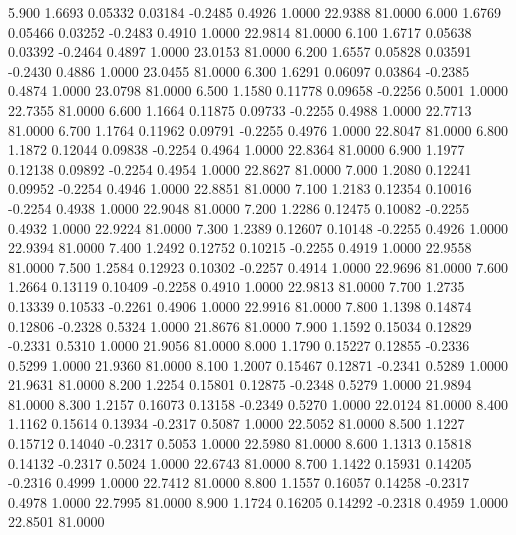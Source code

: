    5.900   1.6693   0.05332   0.03184  -0.2485   0.4926   1.0000  22.9388  81.0000
   6.000   1.6769   0.05466   0.03252  -0.2483   0.4910   1.0000  22.9814  81.0000
   6.100   1.6717   0.05638   0.03392  -0.2464   0.4897   1.0000  23.0153  81.0000
   6.200   1.6557   0.05828   0.03591  -0.2430   0.4886   1.0000  23.0455  81.0000
   6.300   1.6291   0.06097   0.03864  -0.2385   0.4874   1.0000  23.0798  81.0000
   6.500   1.1580   0.11778   0.09658  -0.2256   0.5001   1.0000  22.7355  81.0000
   6.600   1.1664   0.11875   0.09733  -0.2255   0.4988   1.0000  22.7713  81.0000
   6.700   1.1764   0.11962   0.09791  -0.2255   0.4976   1.0000  22.8047  81.0000
   6.800   1.1872   0.12044   0.09838  -0.2254   0.4964   1.0000  22.8364  81.0000
   6.900   1.1977   0.12138   0.09892  -0.2254   0.4954   1.0000  22.8627  81.0000
   7.000   1.2080   0.12241   0.09952  -0.2254   0.4946   1.0000  22.8851  81.0000
   7.100   1.2183   0.12354   0.10016  -0.2254   0.4938   1.0000  22.9048  81.0000
   7.200   1.2286   0.12475   0.10082  -0.2255   0.4932   1.0000  22.9224  81.0000
   7.300   1.2389   0.12607   0.10148  -0.2255   0.4926   1.0000  22.9394  81.0000
   7.400   1.2492   0.12752   0.10215  -0.2255   0.4919   1.0000  22.9558  81.0000
   7.500   1.2584   0.12923   0.10302  -0.2257   0.4914   1.0000  22.9696  81.0000
   7.600   1.2664   0.13119   0.10409  -0.2258   0.4910   1.0000  22.9813  81.0000
   7.700   1.2735   0.13339   0.10533  -0.2261   0.4906   1.0000  22.9916  81.0000
   7.800   1.1398   0.14874   0.12806  -0.2328   0.5324   1.0000  21.8676  81.0000
   7.900   1.1592   0.15034   0.12829  -0.2331   0.5310   1.0000  21.9056  81.0000
   8.000   1.1790   0.15227   0.12855  -0.2336   0.5299   1.0000  21.9360  81.0000
   8.100   1.2007   0.15467   0.12871  -0.2341   0.5289   1.0000  21.9631  81.0000
   8.200   1.2254   0.15801   0.12875  -0.2348   0.5279   1.0000  21.9894  81.0000
   8.300   1.2157   0.16073   0.13158  -0.2349   0.5270   1.0000  22.0124  81.0000
   8.400   1.1162   0.15614   0.13934  -0.2317   0.5087   1.0000  22.5052  81.0000
   8.500   1.1227   0.15712   0.14040  -0.2317   0.5053   1.0000  22.5980  81.0000
   8.600   1.1313   0.15818   0.14132  -0.2317   0.5024   1.0000  22.6743  81.0000
   8.700   1.1422   0.15931   0.14205  -0.2316   0.4999   1.0000  22.7412  81.0000
   8.800   1.1557   0.16057   0.14258  -0.2317   0.4978   1.0000  22.7995  81.0000
   8.900   1.1724   0.16205   0.14292  -0.2318   0.4959   1.0000  22.8501  81.0000
